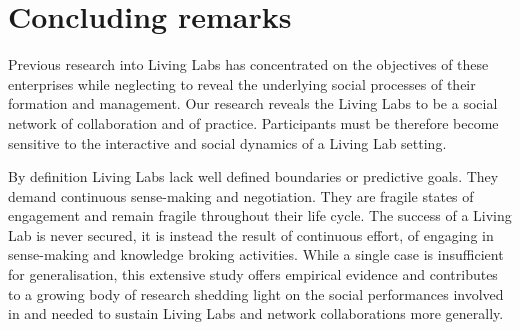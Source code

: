 \documentclass[graybox]{styles/svmult}
\begin{document}
\section{Concluding remarks}
Previous research into Living Labs has concentrated on the objectives of these enterprises while neglecting to reveal the underlying social processes of their formation and management. 
Our research reveals the Living Labs to be a social network of collaboration and of practice. 
Participants must be therefore become sensitive to the interactive and social dynamics of a Living Lab setting. 

By definition Living Labs lack well defined boundaries or predictive goals. They demand continuous sense-making and negotiation. 
They are fragile states of engagement and remain fragile throughout their life cycle. The success of a Living Lab is never secured, it is instead the result of continuous effort, of engaging in sense-making and knowledge broking activities.  
While a single case is insufficient for generalisation, this extensive study offers empirical evidence and contributes to a growing body of research shedding light on the social performances involved in and needed to sustain Living Labs and network collaborations more generally.



 
\end{document}

